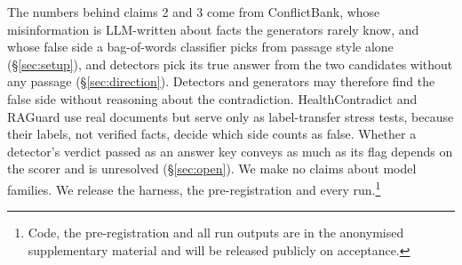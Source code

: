 The numbers behind claims 2 and 3 come from ConflictBank, whose misinformation is
LLM-written about facts the generators rarely know, and whose false side a bag-of-words classifier picks from
passage style alone (\S\ref{sec:setup}), and detectors pick its true answer from the two candidates without any
passage (\S\ref{sec:direction}). Detectors and generators may therefore find the false side without reasoning about
the contradiction. HealthContradict and RAGuard use real documents but serve only
as label-transfer stress tests, because their labels, not verified facts, decide which side counts as false.
Whether a detector's verdict passed as an answer key conveys as much as its flag depends on the scorer and is
unresolved (\S\ref{sec:open}). We make no claims about model families. We release the harness, the
pre-registration and every run.\footnote{Code, the pre-registration and all run outputs are in the anonymised
supplementary material and will be released publicly on acceptance.}
